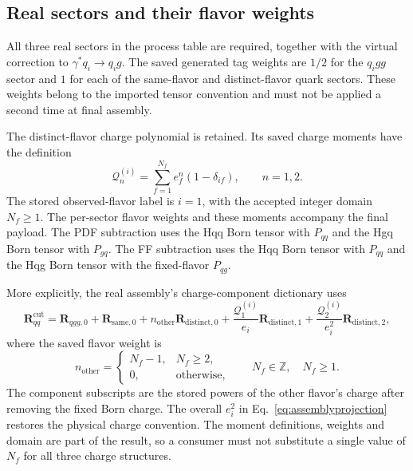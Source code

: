 \documentclass[11pt,a4paper]{article}
\newcommand{\cut}{\mathrm{cut}}
\begin{document}
\subsection{Real sectors and their flavor weights}

All three real sectors in the process table are required, together with
the virtual correction to $\gamma^*q_i\to q_i g$.
The saved generated tag weights are $1/2$ for the $q_i gg$ sector and
$1$ for each of the same-flavor and distinct-flavor quark sectors.
These weights belong to the imported tensor convention and must not be
applied a second time at final assembly.

The distinct-flavor charge polynomial is retained. Its saved charge
moments have the definition
\begin{equation}
 \mathcal Q_n^{(i)}
 =\sum_{f=1}^{N_f}e_f^n(1-\delta_{if}),\qquad n=1,2.
\end{equation}
The stored observed-flavor label is $i=1$, with the accepted integer domain
$N_f\geq1$. The per-sector flavor weights and these moments accompany the
final payload. The PDF subtraction uses the Hqq Born tensor with $P_{qq}$
and the Hgq Born tensor with $P_{gq}$. The FF subtraction uses the Hqq Born
tensor with $P_{qq}$ and the Hqg Born tensor with the fixed-flavor $P_{qg}$.

More explicitly, the real assembly's charge-component dictionary uses
\begin{equation}
 \mathbf R_{qq}^{\cut}=
 \mathbf R_{qgg,0}+\mathbf R_{\mathrm{same},0}
 +n_{\mathrm{other}}\mathbf R_{\mathrm{distinct},0}
 +\frac{\mathcal Q_1^{(i)}}{e_i}\mathbf R_{\mathrm{distinct},1}
 +\frac{\mathcal Q_2^{(i)}}{e_i^2}\mathbf R_{\mathrm{distinct},2},
 \label{eq:hqqcharges}
\end{equation}
where the saved flavor weight is
\begin{equation}
 n_{\mathrm{other}}=
 \begin{cases}N_f-1,&N_f\geq2,\\0,&\text{otherwise},\end{cases}
 \qquad N_f\in\mathbb Z,\quad N_f\geq1.
\end{equation}
The component subscripts are the stored powers of the other flavor's
charge after removing the fixed Born charge. The overall $e_i^2$ in
Eq.~\eqref{eq:assemblyprojection} restores the physical charge
convention. The moment definitions, weights and domain are part of the
result, so a consumer must not substitute a single value of $N_f$ for
all three charge structures.
\end{document}
